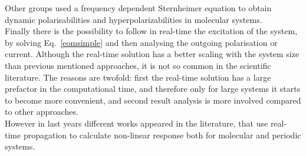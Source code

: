 Other groups used a frequency dependent Sternheimer equation to obtain dynamic polarisabilities and hyperpolarizabilities in molecular systems.\cite{andrade2007time} \\
Finally there is the possibility to follow in real-time the excitation of the system, by solving Eq.~\ref{eomsimple} and then analysing the outgoing polarisation or current. Although the real-time solution has a better scaling  with the system size  than  previous mentioned approaches, it is not so common in the scientific literature. The reasons are twofold: first the real-time solution has a large prefactor in the computational time, and therefore only for large systems it starts to become more convenient, and second result analysis is more involved compared to other approaches. \\ 
However in last years different works appeared in the literature, that use real-time propagation to calculate non-linear response both for molecular\cite{takimoto:154114,ding2013efficient} and periodic systems.\cite{goncharov2013nonlinear}\\


